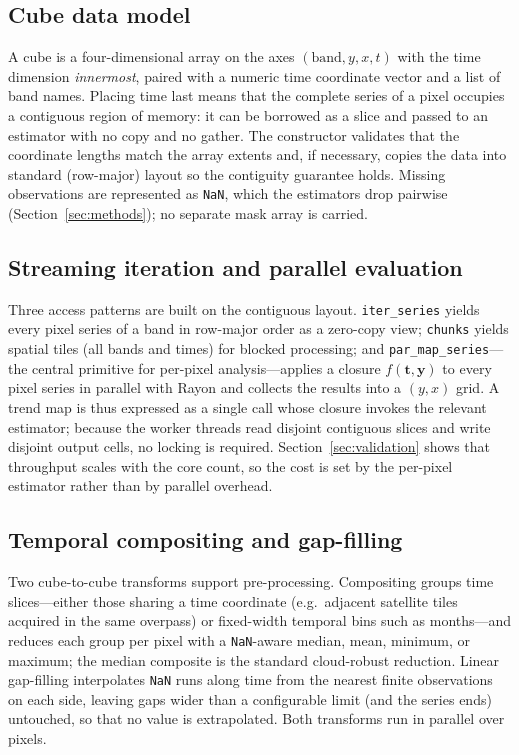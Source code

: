 \documentclass[review]{elsarticle}
\begin{document}
\subsection{Cube data model}
\label{sec:model}
A cube is a four-dimensional array on the axes $(\mathrm{band}, y, x, t)$ with
the time dimension \emph{innermost}, paired with a numeric time coordinate
vector and a list of band names. Placing time last means that the complete
series of a pixel occupies a contiguous region of memory: it can be borrowed as
a slice and passed to an estimator with no copy and no gather. The constructor
validates that the coordinate lengths match the array extents and, if necessary,
copies the data into standard (row-major) layout so the contiguity guarantee
holds. Missing observations are represented as \texttt{NaN}, which the estimators
drop pairwise (Section~\ref{sec:methods}); no separate mask array is carried.

\subsection{Streaming iteration and parallel evaluation}
\label{sec:streaming}
Three access patterns are built on the contiguous layout. \texttt{iter\_series}
yields every pixel series of a band in row-major order as a zero-copy view;
\texttt{chunks} yields spatial tiles (all bands and times) for blocked
processing; and \texttt{par\_map\_series}---the central primitive for per-pixel
analysis---applies a closure $f(\mathbf{t}, \mathbf{y})$ to every pixel series in
parallel with Rayon and collects the results into a $(y, x)$ grid. A trend map is
thus expressed as a single call whose closure invokes the relevant estimator;
because the worker threads read disjoint contiguous slices and write disjoint
output cells, no locking is required. Section~\ref{sec:validation} shows that
throughput scales with the core count, so the cost is set by the per-pixel
estimator rather than by parallel overhead.

\subsection{Temporal compositing and gap-filling}
\label{sec:transforms}
Two cube-to-cube transforms support pre-processing. Compositing groups time
slices---either those sharing a time coordinate (e.g.\ adjacent satellite tiles
acquired in the same overpass) or fixed-width temporal bins such as months---and
reduces each group per pixel with a \texttt{NaN}-aware median, mean, minimum, or
maximum; the median composite is the standard cloud-robust reduction. Linear
gap-filling interpolates \texttt{NaN} runs along time from the nearest finite
observations on each side, leaving gaps wider than a configurable limit (and the
series ends) untouched, so that no value is extrapolated. Both transforms run in
parallel over pixels.
\end{document}
